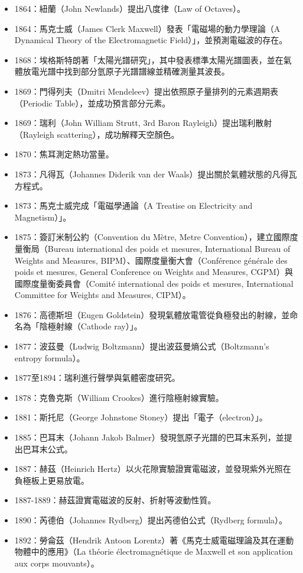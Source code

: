 \documentclass[a4paper,12pt]{article}
\begin{document}
\begin{itemize}
\item 1864：紐蘭（John Newlands）提出八度律（Law of Octaves）。
\item 1864：馬克士威（James Clerk Maxwell）發表「電磁場的動力學理論（A Dynamical Theory of the Electromagnetic Field）」，並預測電磁波的存在。
\item 1868：埃格斯特朗著「太陽光譜研究」，其中發表標準太陽光譜圖表，並在氣體放電光譜中找到部分氫原子光譜譜線並精確測量其波長。
\item 1869：門得列夫（Dmitri Mendeleev）提出依照原子量排列的元素週期表（Periodic Table），並成功預言部分元素。
\item 1869：瑞利（John William Strutt, 3rd Baron Rayleigh）提出瑞利散射（Rayleigh  scattering），成功解釋天空顏色。
\item 1870：焦耳測定熱功當量。
\item 1873：凡得瓦（Johannes Diderik van der Waals）提出關於氣體狀態的凡得瓦方程式。
\item 1873：馬克士威完成「電磁學通論（A Treatise on Electricity and Magnetism）」。
\item 1875：簽訂米制公約（Convention du Mètre, Metre Convention），建立國際度量衡局（Bureau international des poids et mesures, International Bureau of Weights and Measures, BIPM）、國際度量衡大會（Conférence générale des poids et mesures, General Conference on Weights and Measures, CGPM）與國際度量衡委員會（Comité international des poids et mesures, International Committee for Weights and Measures, CIPM）。
\item 1876：高德斯坦（Eugen Goldstein）發現氣體放電管從負極發出的射線，並命名為「陰極射線（Cathode ray）」。
\item 1877：波茲曼（Ludwig Boltzmann）提出波茲曼熵公式（Boltzmann's entropy formula）。
\item 1877至1894：瑞利進行聲學與氣體密度研究。
\item 1878：克魯克斯（William Crookes）進行陰極射線實驗。
\item 1881：斯托尼（George Johnstone Stoney）提出「電子（electron）」。
\item 1885：巴耳末（Johann Jakob Balmer）發現氫原子光譜的巴耳末系列，並提出巴耳末公式。
\item 1887：赫茲（Heinrich Hertz）以火花隙實驗證實電磁波，並發現紫外光照在負極板上更易放電。
\item 1887-1889：赫茲證實電磁波的反射、折射等波動性質。
\item 1890：芮德伯（Johannes Rydberg）提出芮德伯公式（Rydberg formula）。
\item 1892：勞侖茲（Hendrik Antoon Lorentz）著《馬克士威電磁理論及其在運動物體中的應用》（La théorie électromagnétique de Maxwell et son application aux corps mouvants）。

\end{itemize}
\end{document}
